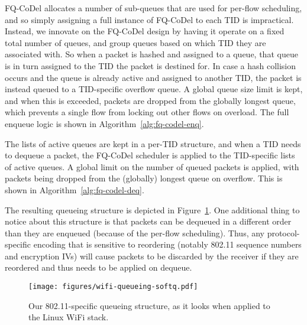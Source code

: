 \documentclass[english]{scrartcl}
\begin{document}
FQ-CoDel allocates a number of sub-queues that are used for per-flow scheduling,
and so simply assigning a full instance of FQ-CoDel to each TID is impractical.
Instead, we innovate on the FQ-CoDel design by having it operate on a fixed
total number of queues, and group queues based on which TID they are associated
with. So when a packet is hashed and assigned to a queue, that queue is in turn
assigned to the TID the packet is destined for. In case a hash collision occurs
and the queue is already active and assigned to another TID, the packet is
instead queued to a TID-specific overflow queue. A global queue size limit is
kept, and when this is exceeded, packets are dropped from the globally longest
queue, which prevents a single flow from locking out other flows on overload.
The full enqueue logic is shown in Algorithm \ref{alg:fq-codel-enq}.

The lists of active queues are kept in a per-TID structure, and when a TID needs
to dequeue a packet, the FQ-CoDel scheduler is applied to the TID-specific lists
of active queues. A global limit on the number of queued packets is applied,
with packets being dropped from the (globally) longest queue on overflow. This
is shown in Algorithm \ref{alg:fq-codel-deq}.

The resulting queueing structure is depicted in Figure \ref{fig:linux-queue-post}. One
additional thing to notice about this structure is that packets can be dequeued
in a different order than they are enqueued (because of the per-flow
scheduling). Thus, any protocol-specific encoding that is sensitive to
reordering (notably 802.11 sequence numbers and encryption IVs) will cause
packets to be discarded by the receiver if they are reordered and thus needs to
be applied on dequeue.

\begin{figure}[t]
\centering
\texttt{[image: figures/wifi-queueing-softq.pdf]}
\caption{\label{fig:linux-queue-post}
Our 802.11-specific queueing structure, as it looks when applied to the Linux WiFi stack.}
\end{figure}
\end{document}
